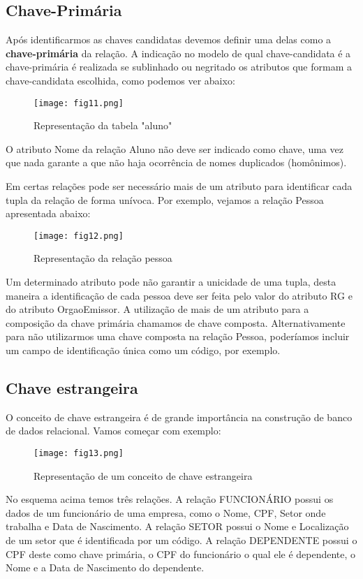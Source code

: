 \documentclass{article}
\begin{document}
\subsection*{Chave-Primária}
Após identificarmos as chaves candidatas devemos definir uma delas como a \textbf{chave-primária} da relação. A indicação no modelo de qual chave-candidata é a chave-primária é realizada se sublinhado ou negritado os atributos que formam a chave-candidata escolhida, como podemos ver abaixo:
\begin{figure}[H]
    \centering
    \texttt{[image: fig11.png]}
    \caption{Representação da tabela "aluno"}
    \label{fig:fig11}
\end{figure}

O atributo Nome da relação Aluno não deve ser indicado como chave, uma vez que nada garante a que não haja ocorrência de nomes duplicados (homônimos).

Em certas relações pode ser necessário mais de um atributo para identificar cada tupla da relação de forma unívoca. Por exemplo, vejamos a relação Pessoa apresentada abaixo:
\begin{figure}[H]
    \centering
    \texttt{[image: fig12.png]}
    \caption{Representação da relação pessoa}
    \label{fig:fig12}
\end{figure}

Um determinado atributo pode não garantir a unicidade de uma tupla, desta maneira a identificação de cada pessoa deve ser feita pelo valor do atributo RG e do atributo OrgaoEmissor. A utilização de mais de um atributo para a composição da chave primária chamamos de chave composta. Alternativamente para não utilizarmos uma chave composta na relação Pessoa, poderíamos incluir um campo de identificação única como um código, por exemplo.

\subsection*{Chave estrangeira}
O conceito de chave estrangeira é de grande importância na construção de banco de dados relacional. Vamos começar com exemplo:
\begin{figure}[H]
    \centering
    \texttt{[image: fig13.png]}
    \caption{Representação de um conceito de chave estrangeira}
    \label{fig:fig13}
\end{figure}

No esquema acima temos três relações. A relação FUNCIONÁRIO possui os dados de um funcionário de uma empresa, como o Nome, CPF, Setor onde trabalha e Data de Nascimento. A relação SETOR possui o Nome e Localização de um setor que é identificada por um código. A relação DEPENDENTE possui o CPF deste como chave primária, o CPF do funcionário o qual ele é dependente, o Nome e a Data de Nascimento do dependente.
\end{document}
